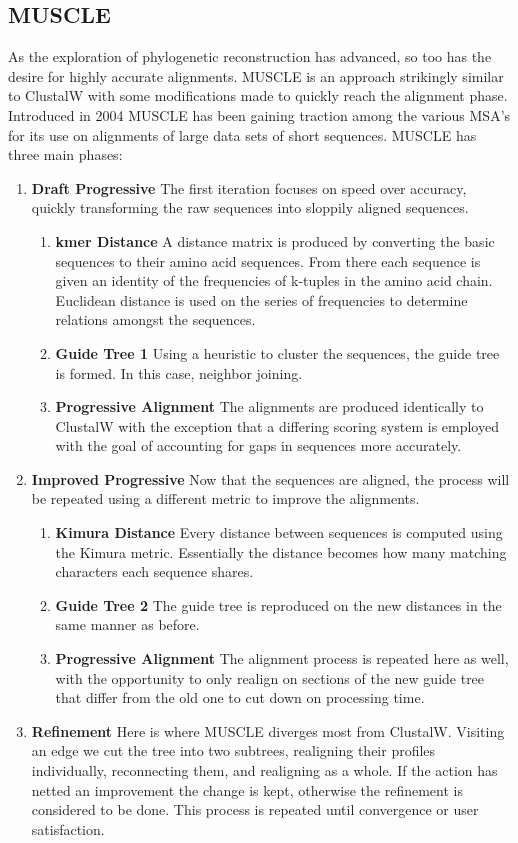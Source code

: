 \documentclass[10pt,twocolumn]{article}
\begin{document}
\subsection*{MUSCLE}
As the exploration of phylogenetic reconstruction has advanced, so too has the desire for highly accurate alignments. MUSCLE is an approach strikingly similar to ClustalW with some modifications made to quickly reach the alignment phase. Introduced in 2004 MUSCLE has been gaining traction among the various MSA's for its use on alignments of large data sets of short sequences. MUSCLE has three main phases:
\begin{enumerate}
  \item \textbf{Draft Progressive} The first iteration focuses on speed over accuracy, quickly transforming the raw sequences into sloppily aligned sequences.
  \begin{enumerate}
  	\item \textbf{kmer Distance} A distance matrix is produced by converting the basic sequences to their amino acid sequences. From there each sequence is given an identity of the frequencies of k-tuples in the amino acid chain. Euclidean distance is used on the series of frequencies to determine relations amongst the sequences.
  	\item \textbf{Guide Tree 1} Using a heuristic to cluster the sequences, the guide tree is formed. In this case, neighbor joining.
  	\item \textbf{Progressive Alignment} The alignments are produced identically to ClustalW with the exception that a differing scoring system is employed with the goal of accounting for gaps in sequences more accurately.
\end{enumerate}
  \item \textbf{Improved Progressive} Now that the sequences are aligned, the process will be repeated using a different metric to improve the alignments.
    \begin{enumerate}
  	\item \textbf{Kimura Distance} Every distance between sequences is computed using the Kimura metric. Essentially the distance becomes how many matching characters each sequence shares.
  	\item \textbf{Guide Tree 2} The guide tree is reproduced on the new distances in the same manner as before.
  	\item \textbf{Progressive Alignment} The alignment process is repeated here as well, with the opportunity to only realign on sections of the new guide tree that differ from the old one to cut down on processing time.
\end{enumerate}
  \item \textbf{Refinement} Here is where MUSCLE diverges most from ClustalW. Visiting an edge we cut the tree into two subtrees, realigning their profiles individually, reconnecting them, and realigning as a whole.  If the action has netted an improvement the change is kept, otherwise the refinement is considered to be done. This process is repeated until convergence or user satisfaction.
  \end{enumerate}
  
\end{document}
